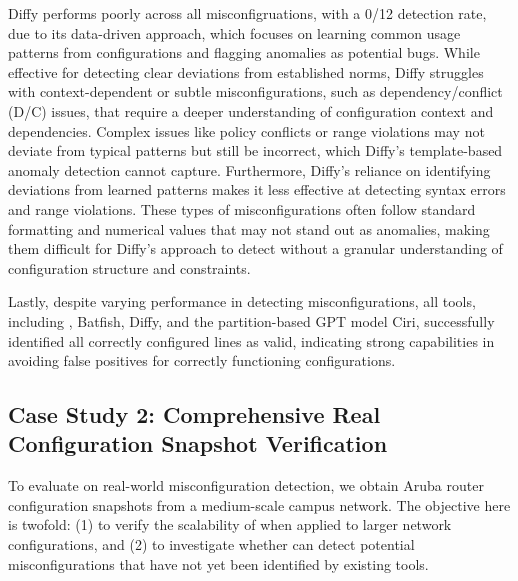 Diffy performs poorly across all misconfigruations, with a 0/12 detection rate, due to its data-driven approach, which focuses on learning common usage patterns from configurations and flagging anomalies as potential bugs. While effective for detecting clear deviations from established norms, Diffy struggles with context-dependent or subtle misconfigurations, such as dependency/conflict (D/C) issues, that require a deeper understanding of configuration context and dependencies. Complex issues like policy conflicts or range violations may not deviate from typical patterns but still be incorrect, which Diffy’s template-based anomaly detection cannot capture. Furthermore, Diffy's reliance on identifying deviations from learned patterns makes it less effective at detecting syntax errors and range violations. These types of misconfigurations often follow standard formatting and numerical values that may not stand out as anomalies, making them difficult for Diffy's approach to detect without a granular understanding of configuration structure and constraints.

Lastly, despite varying performance in detecting misconfigurations, all tools, including \sysname{}, Batfish, Diffy, and the partition-based GPT model Ciri, successfully identified all correctly configured lines as valid, indicating strong capabilities in avoiding false positives for correctly functioning configurations. 

\subsection{Case Study 2: Comprehensive Real Configuration Snapshot Verification}
To evaluate \sysname{} on real-world misconfiguration detection, we obtain Aruba router configuration snapshots from a medium-scale campus network. The objective here is twofold: (1) to verify the scalability of \sysname{} when applied to larger network configurations, and (2) to investigate whether \sysname{} can detect potential misconfigurations that have not yet been identified by existing tools.


